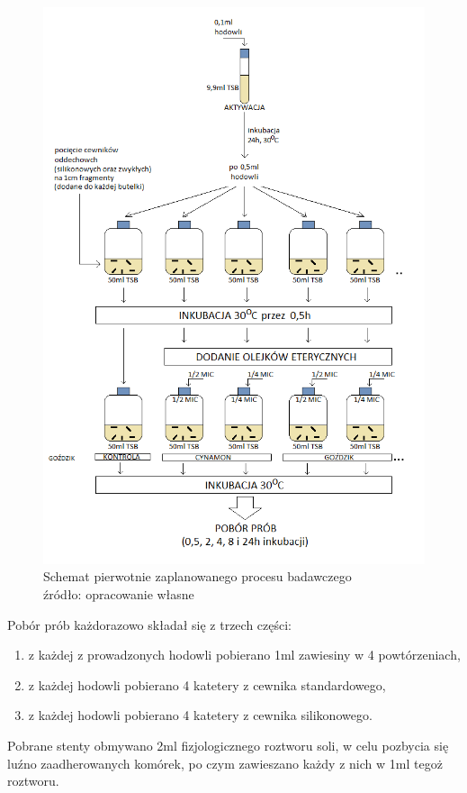 \documentclass[11pt,a4paper]{report}
\begin{document}
\clearpage
\begin{figure}[!h]
\begin{center}
\includegraphics[scale=0.72]{img/mgr_metodyka_stara.png}
\caption{Schemat pierwotnie zaplanowanego procesu badawczego\\
źródło: opracowanie własne}\label{costam}
\end{center} 
\end{figure}
\clearpage

Pobór prób każdorazowo składał się z trzech części:
\begin{enumerate}
\item z każdej z prowadzonych hodowli pobierano 1ml zawiesiny w 4 powtórzeniach,
\item z każdej hodowli pobierano 4 katetery z cewnika standardowego, 
\item z każdej hodowli pobierano 4 katetery z cewnika silikonowego.
\end{enumerate}
Pobrane stenty obmywano 2ml fizjologicznego roztworu soli, w celu pozbycia się luźno zaadherowanych komórek, po czym zawieszano każdy z nich w 1ml tegoż roztworu.
\end{document}
